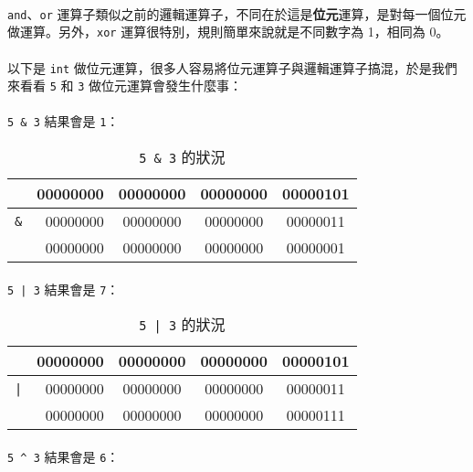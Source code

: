 \documentclass[12pt,a4paper,oneside]{report}
\begin{document}
\begin{CJK}{UTF8}{bkai}
\paragraph{}\texttt{and}、\texttt{or} 運算子類似之前的邏輯運算子，不同在於這是\textbf{位元}運算，是對每一個位元做運算。另外，\texttt{xor} 運算很特別，規則簡單來說就是不同數字為 1，相同為 0。
\paragraph{}以下是 \lstinline!int! 做位元運算，很多人容易將位元運算子與邏輯運算子搞混，於是我們來看看 \lstinline!5! 和 \lstinline!3! 做位元運算會發生什麼事：
\paragraph{}\lstinline!5 & 3! 結果會是 \lstinline!1!：

\begin{table}[h!]
\centering
\begin{tabular}{|c|r|c|c|c|}
\hline
 & 00000000 & 00000000 & 00000000 & 00000{\color{red}101}\\
\hline
\lstinline!&! & 00000000 & 00000000 & 00000000 & 00000{\color{red}011}\\
\hline\hline
 & 00000000 & 00000000 & 00000000 & 00000{\color{red}001}\\
\hline
\end{tabular}
\caption{\lstinline!5 & 3! 的狀況}
\label{basic:cpp:table:5:and:3}
\end{table}

\paragraph{}\lstinline!5 | 3! 結果會是 \lstinline!7!：

\begin{table}[h!]
\centering
\begin{tabular}{|c|r|c|c|c|}
\hline
 & 00000000 & 00000000 & 00000000 & 00000{\color{red}101}\\
\hline
\lstinline!|! & 00000000 & 00000000 & 00000000 & 00000{\color{red}011}\\
\hline\hline
 & 00000000 & 00000000 & 00000000 & 00000{\color{red}111}\\
\hline
\end{tabular}
\caption{\lstinline!5 | 3! 的狀況}
\label{basic:cpp:table:5:or:3}
\end{table}

\paragraph{}\lstinline!5 ^ 3! 結果會是 \lstinline!6!：


\end{CJK}
\end{document}
